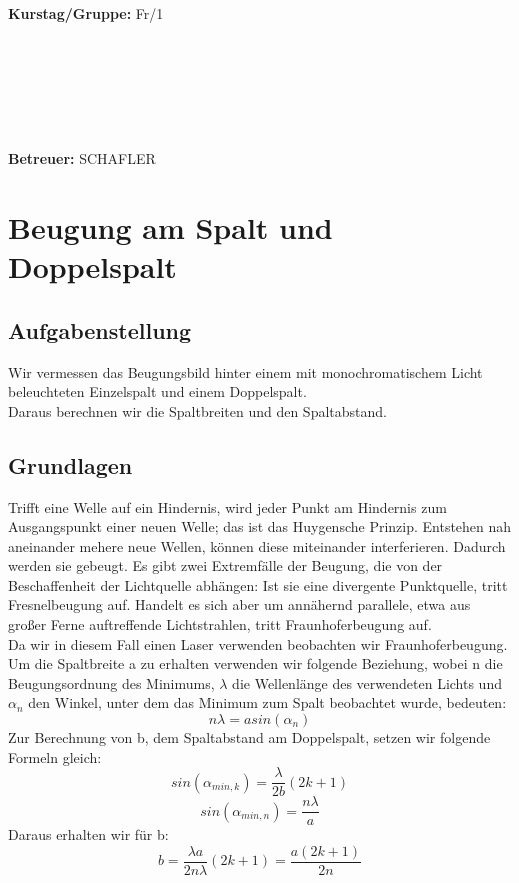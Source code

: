 \documentclass{article}
\begin{document}
\begin{verbatim}


\end{verbatim}
			\begin{flushleft}
			\textbf{\Large{Kurstag/Gruppe:}} \Large{Fr/1}
			\end{flushleft}

\begin{verbatim}






\end{verbatim}
			\begin{flushleft}
			\LARGE{\textbf{Betreuer:}}	\Large{SCHAFLER}	
			\end{flushleft}
\newpage	

\section{Beugung am Spalt und Doppelspalt}

\subsection{Aufgabenstellung}
Wir vermessen das Beugungsbild hinter einem mit monochromatischem Licht  beleuchteten Einzelspalt und einem Doppelspalt. \\
Daraus berechnen wir die Spaltbreiten und den Spaltabstand.
\subsection{Grundlagen}
Trifft eine Welle auf ein Hindernis, wird jeder Punkt am Hindernis zum Ausgangspunkt einer neuen Welle; das ist das Huygensche Prinzip. Entstehen nah aneinander mehere neue Wellen, können diese miteinander interferieren. Dadurch werden sie gebeugt. Es gibt zwei Extremfälle der Beugung, die von der Beschaffenheit der Lichtquelle abhängen: Ist sie eine divergente Punktquelle, tritt Fresnelbeugung auf. Handelt es sich aber um annähernd parallele, etwa aus großer Ferne auftreffende Lichtstrahlen, tritt Fraunhoferbeugung auf. \\ 
Da wir in diesem Fall einen Laser verwenden beobachten wir Fraunhoferbeugung.\\
Um die Spaltbreite a zu erhalten verwenden wir folgende Beziehung, wobei n die Beugungsordnung des Minimums, $\lambda$ die Wellenlänge des verwendeten Lichts und $\alpha_n$ den Winkel, unter dem das Minimum zum Spalt beobachtet wurde, bedeuten:
\begin{equation}
\label{spaltbreite}
n\lambda=a sin(\alpha_n)
\end{equation}
Zur Berechnung von b, dem Spaltabstand am Doppelspalt, setzen wir folgende Formeln gleich:\\
$$sin(\alpha_{min,k})=\frac{\lambda}{2b}(2k+1)$$
$$sin(\alpha_{min,n})=\frac{n\lambda}{a}$$
Daraus erhalten wir für b:
\begin{equation}
\label{spaltabstand}
b=\frac{\lambda a}{2n\lambda}(2k+1)=\frac{a(2k+1)}{2n}
\end{equation}
\end{document}
